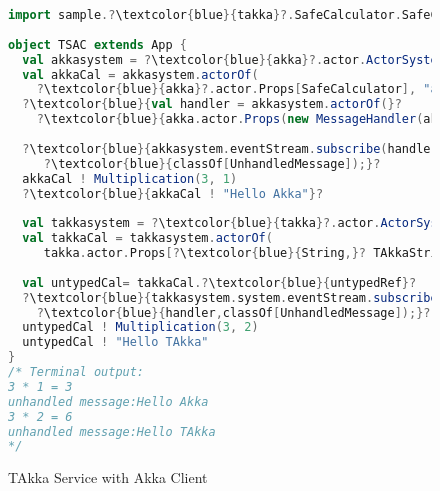 \begin{figure}[h]
      \begin{lstlisting}[language=scala, escapechar=?]
import sample.?\textcolor{blue}{takka}?.SafeCalculator.SafeCalculator      
      
object TSAC extends App {
  val akkasystem = ?\textcolor{blue}{akka}?.actor.ActorSystem("AkkaSystem")
  val akkaCal = akkasystem.actorOf(
    ?\textcolor{blue}{akka}?.actor.Props[SafeCalculator], "acal")
  ?\textcolor{blue}{val handler = akkasystem.actorOf(}?
    ?\textcolor{blue}{akka.actor.Props(new MessageHandler(akkasystem)))}?
  
  ?\textcolor{blue}{akkasystem.eventStream.subscribe(handler,}?
     ?\textcolor{blue}{classOf[UnhandledMessage]);}?
  akkaCal ! Multiplication(3, 1)     
  ?\textcolor{blue}{akkaCal ! "Hello Akka"}?
  
  val takkasystem = ?\textcolor{blue}{takka}?.actor.ActorSystem("TAkkaSystem")
  val takkaCal = takkasystem.actorOf(
     takka.actor.Props[?\textcolor{blue}{String,}? TAkkaStringActor], "tcal")
  
  val untypedCal= takkaCal.?\textcolor{blue}{untypedRef}?  
  ?\textcolor{blue}{takkasystem.system.eventStream.subscribe(}?
    ?\textcolor{blue}{handler,classOf[UnhandledMessage]);}?  
  untypedCal ! Multiplication(3, 2)     
  untypedCal ! "Hello TAkka"
}
/* Terminal output:
3 * 1 = 3
unhandled message:Hello Akka
3 * 2 = 6
unhandled message:Hello TAkka
*/
    \end{lstlisting}
    \caption{TAkka Service with Akka Client}
\label{akkaINtakka}
\end{figure}
